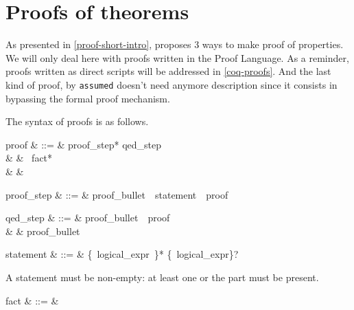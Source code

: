 
\section{Proofs of  theorems}
As presented in \ref{proof-short-intro}, {\focal} proposes 3 ways to
make proof of properties. We will only deal here with proofs written
in the {\focal} Proof Language. As a reminder, proofs written as
direct {\coq} scripts will be addressed in \ref{coq-proofs}. And the
last kind of proof, by {\tt assumed} doesn't need anymore description
since it consists in bypassing the formal proof mechanism.

The syntax of proofs is as follows.
\begin{syntax}
proof & ::=  & {proof\_step*} qed\_step \\
      & \mid & \ fact* \\
      & \mid & 
\end{syntax}

\begin{syntax}
proof\_step & ::=  & proof\_bullet~~statement~~proof
\end{syntax}

\begin{syntax}
qed\_step & ::=  & proof\_bullet\ \ proof \\
          & \mid & proof\_bullet\ 
\end{syntax}

\begin{syntax}
statement & ::=  & {\{\ logical\_expr\ \terminal{,}\}*}
                   \{\ logical\_expr\}?
\end{syntax}
A statement must be non-empty: at least one  or the
 part must be present.

\begin{syntax}
fact & ::= & 
\end{syntax}
